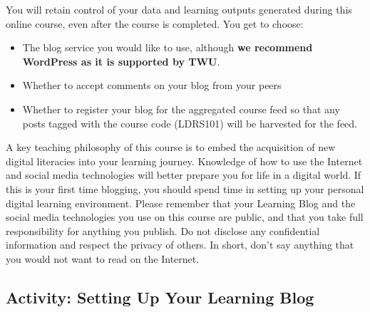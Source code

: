 \documentclass[
]{book}
\providecommand{\tightlist}{%
  \setlength{\itemsep}{0pt}\setlength{\parskip}{0pt}}
\theoremstyle{definition}
\theoremstyle{definition}
\theoremstyle{definition}
\theoremstyle{definition}
\theoremstyle{remark}
\begin{document}
You will retain control of your data and learning outputs generated during this online course, even after the course is completed.
You get to choose:

\begin{itemize}
\tightlist
\item
  The blog service you would like to use, although \textbf{we recommend WordPress as it is supported by TWU}.\\
\item
  Whether to accept comments on your blog from your peers\\
\item
  Whether to register your blog for the aggregated course feed so that any posts tagged with the course code (LDRS101) will be harvested for the feed.
\end{itemize}

A key teaching philosophy of this course is to embed the acquisition of new digital literacies into your learning journey. Knowledge of how to use the Internet and social media technologies will better prepare you for life in a digital world. If this is your first time blogging, you should spend time in setting up your personal digital learning environment. Please remember that your Learning Blog and the social media technologies you use on this course are public, and that you take full responsibility for anything you publish. Do not disclose any confidential information and respect the privacy of others. In short, don't say anything that you would not want to read on the Internet.

\hypertarget{activity-setting-up-your-learning-blog}{%
\subsection*{Activity: Setting Up Your Learning Blog}\label{activity-setting-up-your-learning-blog}}
\end{document}
